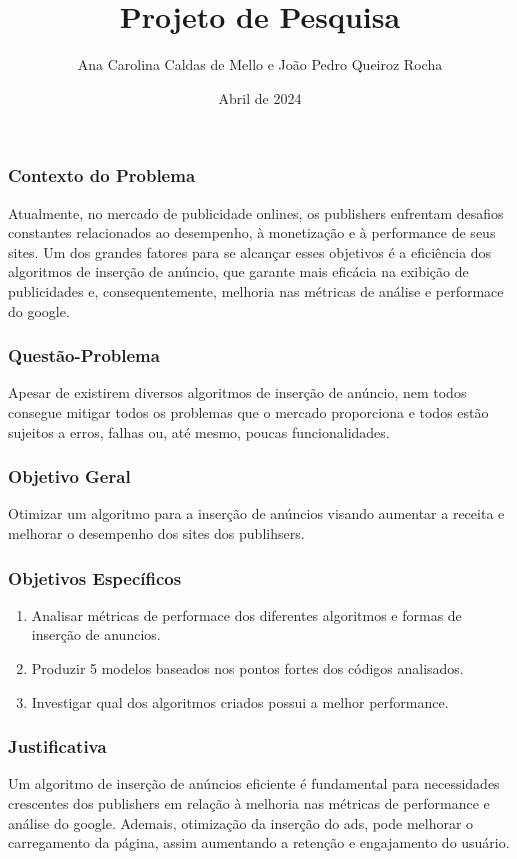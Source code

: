 \documentclass{beamer}
\title{Projeto de Pesquisa}
\author{Ana Carolina Caldas de Mello e João Pedro Queiroz Rocha}
\date{Abril de 2024}
\begin{document}
\maketitle

\begin{frame}
    \frametitle{Contexto do Problema}
    Atualmente, no mercado de publicidade onlines, os publishers enfrentam desafios constantes relacionados ao desempenho, à monetização e à performance de seus sites. Um dos grandes fatores para se alcançar esses objetivos é a eficiência dos algoritmos de inserção de anúncio, que garante mais eficácia na exibição de publicidades e, consequentemente, melhoria nas métricas de análise e performace do google.
\end{frame}

\begin{frame}
    \frametitle{Questão-Problema}
    Apesar de existirem diversos algoritmos de inserção de anúncio, nem todos consegue mitigar todos os problemas que o mercado proporciona e todos estão sujeitos a erros, falhas ou, até mesmo, poucas funcionalidades. 
\end{frame}

\begin{frame}
    \frametitle{Objetivo Geral}
    Otimizar um algoritmo para a inserção de anúncios visando aumentar a receita e melhorar o desempenho dos sites dos publihsers.
\end{frame}

\begin{frame}
    \frametitle{Objetivos Específicos}
    \begin{enumerate}
       \item Analisar métricas de performace dos diferentes algoritmos e formas de inserção de anuncios.
       \item Produzir 5 modelos baseados nos pontos fortes dos códigos analisados.
       \item Investigar qual dos algoritmos criados possui a melhor performance.
     \end{enumerate}
\end{frame}

\begin{frame}
    \frametitle{Justificativa}
    Um algoritmo de inserção de anúncios eficiente é fundamental para necessidades crescentes dos publishers em relação à melhoria nas métricas de performance e análise do google. Ademais, otimização da inserção do ads, pode melhorar o carregamento da página, assim aumentando a retenção e engajamento do usuário.
\end{frame}
\end{document}
